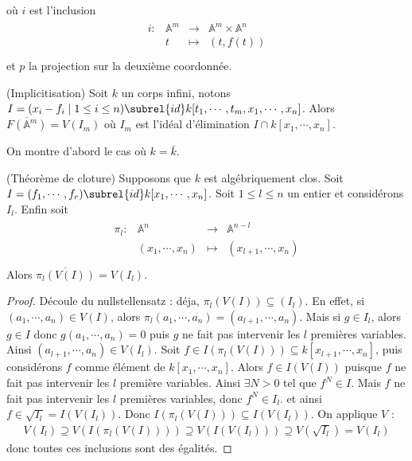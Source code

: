             où $i$ est l'inclusion
            \begin{align*}
                \begin{array}{cccc}
                    i : & \mathbb{A}^m & \to & \mathbb{A}^m \times \mathbb{A}^n \\
                    & t & \mapsto & (t, f(t))\\
                \end{array}
            \end{align*}
            et $p$ la projection sur la deuxième coordonnée.
            \begin{theo} \label{implicitisation} (Implicitisation)
                Soit $k$ un corps infini, notons \linebreak $I = (x_i - f_i \mid 1 \leq i \leq n) \subrel{id} k[t_1, \cdots, t_m, x_1, \cdots, x_n]$. Alors $\overline{F(\mathbb{A}^m)} = V(I_m)$ où $I_m$ est l'idéal d'élimination $I \cap k[x_1, \cdots, x_n]$.
            \end{theo}
            On montre d'abord le cas où $k = \bar k$.
            \begin{theo} (Théorème de cloture)
                Supposons que $k$ est algébriquement clos. Soit $I = (f_1, \cdots, f_r) \subrel{id} k[x_1, \cdots, x_n]$. Soit $1 \leq l \leq n$ un entier et considérons $I_l$. Enfin soit
                \begin{align}
                    \begin{array}{cccc}
                        \pi_l : & \mathbb{A}^n & \to & \mathbb{A}^{n-l} \\
                        & (x_1, \cdots, x_n) & \mapsto & (x_{l+1}, \cdots, x_n) \\
                    \end{array}
                \end{align}
                Alors $\overline{\pi_l(V(I))} = V(I_l)$.  
            \end{theo}
            \begin{proof}
                Découle du nullstellensatz : déja, $\pi_l(V(I)) \subseteq(I_l)$. En effet, si $(a_1, \cdots, a_n) \in V(I)$, alors $\pi_l(a_1, \cdots, a_n) = (a_{l+1}, \cdots, a_n)$. Mais si $g \in I_l$, alors $g \in I$ donc $g(a_1, \cdots, a_n) = 0$ puis $g$ ne fait pas intervenir les $l$ premières variables. Ainsi $(a_{l+1}, \cdots, a_n) \in V(I_l)$. Soit $f \in I(\pi_l(V(I))) \subseteq k[x_{l+1}, \cdots, x_n]$, puis considérons $f$ comme élément de $k[x_1, \cdots, x_n]$. Alors $f \in I(V(I))$ puisque $f$ ne fait pas intervenir les $l$ première variables. Ainsi $\exists N > 0$ tel que $f^N \in I$. Mais $f$ ne fait pas intervenir les $l$ premières variables, donc $f^N \in I_l$. et ainsi $f \in \sqrt{I_l} = I(V(I_l))$. Donc $I(\pi_l(V(I))) \subseteq I(V(I_l))$.  On applique $V$ : 
                \begin{align*}
                    V(I_l) \supseteq V(I(\pi_l(V(I)))) \supseteq V(I(V(I_l))) \supseteq V(\sqrt{I_l}) = V(I_l)
                \end{align*}
                donc toutes ces inclusions sont des égalités. 
            \end{proof}
